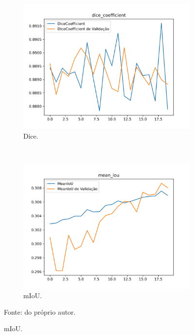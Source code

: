\begin{figure}[H]
     \begin{subfigure}[t]{0.45\textwidth}
         \centering
         \includegraphics[width=1\linewidth]{recursos/imagens/results/bpca_unetlike20_miou_dice_coefficient.png}
         \caption{Dice.}
         \label{results:fig:semantic:7.3}
     \end{subfigure}
     ~
     \begin{subfigure}[t]{0.45\textwidth}
         \centering
         \includegraphics[width=1\linewidth]{recursos/imagens/results/bpca_unetlike20_miou_mean_iou.png}
         \caption{mIoU.}
         \label{results:fig:semantic:7.4}
     \end{subfigure}
     
     Fonte: do próprio autor.
\end{figure}

